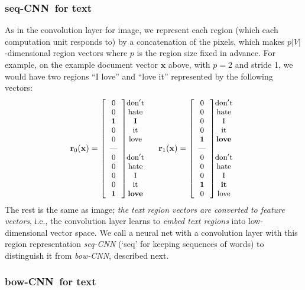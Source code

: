 \documentclass[11pt,letterpaper]{article}
\newcommand{\scnn}{seq-CNN}
\newcommand{\bcnn}{bow-CNN}
\newcommand{\bx}{{\mathbf x}}
\newcommand{\psz}{p}
\newcommand{\voc}{V}
\newcommand{\vsz}{|\voc|}
\newcommand{\region}{{\mathbf r}} \newcommand{\iL}{\ell} \newcommand{\nL}{L}
\newcommand{\bEqsz}{\begin{small}}
\newcommand{\eEqsz}{\end{small}}
\begin{document}
\subsubsection{\scnn\ for text}
\label{sec:scnn}

As in the convolution layer for image, we 
represent each region (which each computation unit responds to) 
by a concatenation of the pixels, 
which makes $\psz\vsz$-dimensional region vectors where $\psz$ is the region size 
fixed in advance.  
For example, on the example document vector $\bx$ above, with $\psz=2$ and stride 1, 
we would have two regions 
``I love'' and ``love it'' represented by the following vectors: 
\[
\bEqsz
\region_0(\bx)=  \left[ 
  \begin{array}{c} 0 \cr 0 \cr{\bf 1}\cr 0 \cr 0 \cr \mbox{---} \cr 0 \cr 0 \cr 0 \cr 0 \cr {\bf 1} \cr \end{array} 
\right]
\hspace{-0.1in}
  \begin{array}{c} {\rm don't}\cr{\rm hate}\cr{\rm \bf I}\cr{\rm it}\cr{\rm love}\cr   \cr  
                   {\rm don't}\cr{\rm hate}\cr{\rm I}\cr{\rm it}\cr{\rm \bf love}\cr \end{array} 
~~~~                   
\region_1(\bx)=  \left[ 
  \begin{array}{c}  0 \cr 0 \cr 0 \cr 0 \cr {\bf 1} \cr \mbox{---} \cr 0 \cr 0 \cr 0 \cr{\bf 1}\cr 0 \cr \end{array} 
\right]
\hspace{-0.1in}
  \begin{array}{c} {\rm don't}\cr{\rm hate}\cr{\rm I}\cr{\rm it}\cr{\rm \bf love}\cr   \cr  
                   {\rm don't}\cr{\rm hate}\cr{\rm I}\cr{\rm \bf it}\cr{\rm love}\cr \end{array}       
\eEqsz
\]
The rest is the same as image; 
{\em the text region vectors are converted to feature vectors}, 
i.e., 
the convolution layer learns to {\em embed text regions} into low-dimensional vector space.   
We call a neural net with a convolution layer with this region representation 
{\em \scnn} (`seq' for keeping sequences of words) 
to distinguish it from {\em \bcnn}, described next.  

\subsubsection{\bcnn\ for text} 
\label{sec:bowconv}
\end{document}
